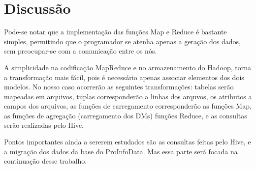 \chapter{\textbf{Discussão}}

Pode-se notar que a implementação das funções Map e Reduce é bastante
simples, permitindo que o programador se atenha apenas a geração dos
dados, sem preocupar-se com a comunicação entre os nós.

A simplicidade na codificação MapReduce e no armazenamento do
Hadoop, torna a transformação mais fácil, pois é necessário apenas associar elementos dos dois modelos.
No nosso caso ocorrerão as seguintes transformações: 
tabelas serão mapeadas em arquivos, tuplas corresponderão a linhas dos arquvos, os atributos a campos dos arquivos, 
as funções de carregamento corresponderão as funções Map, as funções de agregação
(carregamento dos DMs) funções Reduce, e as consultas serão realizadas pelo Hive.

Pontos importantes ainda a sererem estudados são as consultas feitas
pelo Hive, e a migração dos dados da base do ProInfoData. Mas essa parte
será focada na continuação desse trabalho.
